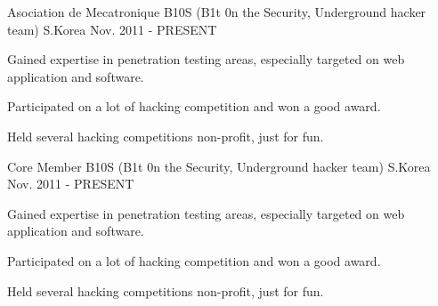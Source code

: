 

\begin{cventries}

  \cventry
    {Asociation de Mecatronique} %
    {B10S (B1t 0n the Security, Underground hacker team)} %
    {S.Korea} %
    {Nov. 2011 - PRESENT} %
    {
      \begin{cvitems} %
        \item {Gained expertise in penetration testing areas, especially targeted on web application and software.}
        \item {Participated on a lot of hacking competition and won a good award.}
        \item {Held several hacking competitions non-profit, just for fun.}
      \end{cvitems}
    }

\end{cventries}




\begin{cventries}
	
	\cventry
	{Core Member} %
	{B10S (B1t 0n the Security, Underground hacker team)} %
	{S.Korea} %
	{Nov. 2011 - PRESENT} %
	{
		\begin{cvitems} %
			\item {Gained expertise in penetration testing areas, especially targeted on web application and software.}
			\item {Participated on a lot of hacking competition and won a good award.}
			\item {Held several hacking competitions non-profit, just for fun.}
		\end{cvitems}
	}
	

	
	
\end{cventries}
